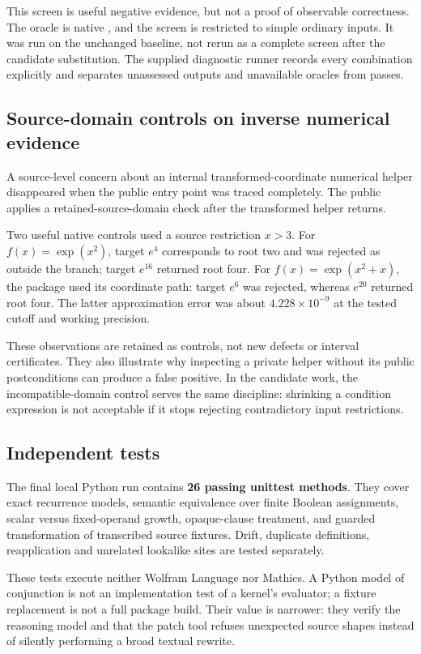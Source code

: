 \documentclass[11pt,a4paper]{article}
\newcommand{\code}[1]{\texttt{\detokenize{#1}}}
\begin{document}
This screen is useful negative evidence, but not a proof of observable correctness. The oracle is native \code{Series}, and the screen is restricted to simple ordinary inputs. It was run on the unchanged baseline, not rerun as a complete screen after the candidate substitution. The supplied diagnostic runner records every combination explicitly and separates unassessed outputs and unavailable oracles from passes.

\subsection{Source-domain controls on inverse numerical evidence}
A source-level concern about an internal transformed-coordinate numerical helper disappeared when the public entry point was traced completely. The public \code{InverseNumericalCheck} applies a retained-source-domain check after the transformed helper returns.\cite{numericalwrapper,coordinate}

Two useful native controls used a source restriction $x>3$. For $f(x)=\exp(x^2)$, target $e^4$ corresponds to root two and was rejected as outside the branch; target $e^{16}$ returned root four. For $f(x)=\exp(x^2+x)$, the package used its \code{TargetLog} coordinate path: target $e^6$ was rejected, whereas $e^{20}$ returned root four. The latter approximation error was about $4.228\times10^{-9}$ at the tested cutoff and working precision.

These observations are retained as controls, not new defects or interval certificates. They also illustrate why inspecting a private helper without its public postconditions can produce a false positive. In the candidate work, the incompatible-domain control serves the same discipline: shrinking a condition expression is not acceptable if it stops rejecting contradictory input restrictions.

\subsection{Independent tests}
The final local Python run contains \textbf{26 passing unittest methods}. They cover exact recurrence models, semantic equivalence over finite Boolean assignments, scalar versus fixed-operand growth, opaque-clause treatment, and guarded transformation of transcribed source fixtures. Drift, duplicate definitions, reapplication and unrelated lookalike sites are tested separately.

These tests execute neither Wolfram Language nor Mathics. A Python model of conjunction is not an implementation test of a kernel's evaluator; a fixture replacement is not a full package build. Their value is narrower: they verify the reasoning model and that the patch tool refuses unexpected source shapes instead of silently performing a broad textual rewrite.
\end{document}
